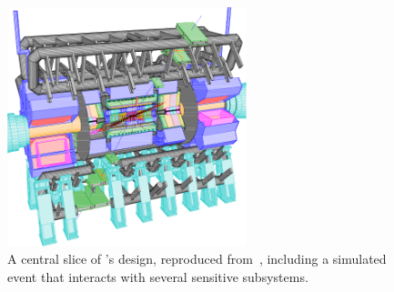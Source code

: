 \begin{figure}[tp]
\centering
\includegraphics[width=0.62\textwidth]{figures/atlas_cutaway_volume_1.pdf}
\caption[
A central slice of \atlas's design
]{%
A central slice of \atlas's design, reproduced from~\cite{atlas1999design1,
persint2014manual},
including a simulated event that interacts with several sensitive subsystems.
}
\label{fig:atlas_cutaway}
\end{figure}

